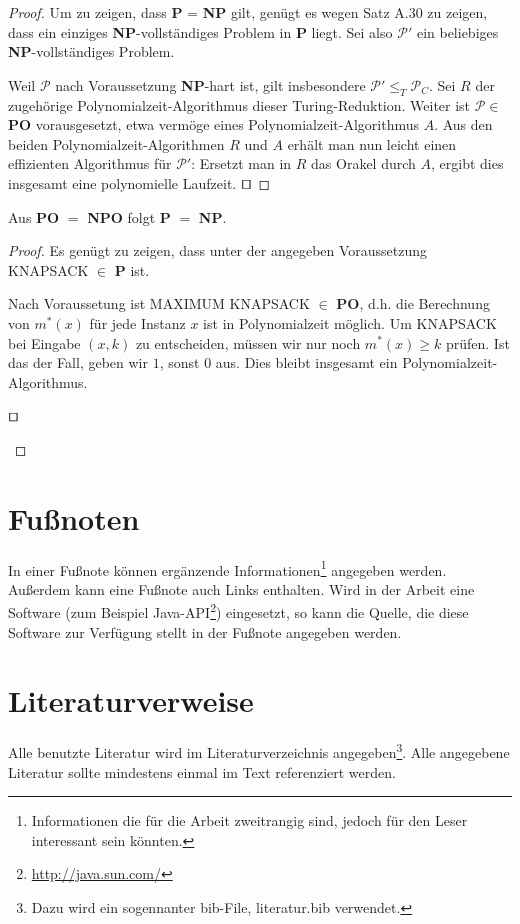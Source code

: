 \begin{proof} Um zu zeigen, dass \textbf{P} = \textbf{NP} gilt, genügt es
wegen Satz A.30 zu zeigen, dass ein einziges \textbf{NP}-vollständiges
Problem in \textbf{P} liegt. Sei also $\mathcal{P}'$ ein beliebiges \textbf{NP}-vollständiges Problem.

Weil $\mathcal{P}$ nach Voraussetzung \textbf{NP}-hart ist, gilt insbesondere
$\mathcal{P}' \leq_T \mathcal{P}_C$. Sei $R$ der zugehörige
Polynomialzeit-Algorithmus dieser Turing-Reduktion.
Weiter ist $\mathcal{P} \in$ \textbf{PO} vorausgesetzt, etwa vermöge eines
Polynomialzeit-Algorithmus $A$. Aus den beiden
Polynomialzeit-Algorithmen $R$ und $A$ erhält man nun
leicht einen effizienten Algorithmus für $\mathcal{P}'$: Ersetzt man
in $R$ das Orakel durch $A$, ergibt dies insgesamt eine polynomielle
Laufzeit. 
$\qed$
\end{proof}

\begin{lemma} Aus \textbf{PO} $=$ \textbf{NPO} folgt \textbf{P} $=$ \textbf{NP}.
\end{lemma}

\begin{proof} Es genügt zu zeigen, dass unter der angegeben
Voraussetzung KNAPSACK $\in$ \textbf{P} ist.

Nach Voraussetung ist MAXIMUM KNAPSACK $\in$ \textbf{PO},
d.h. die Berechnung von $m^*(x)$ für jede Instanz $x$ ist
in Polynomialzeit möglich. Um KNAPSACK bei Eingabe
$(x,k)$ zu entscheiden, müssen wir nur noch $m^*(x) \geq k$
prüfen. Ist das der Fall, geben wir $1$, sonst $0$ aus. Dies
bleibt insgesamt ein Polynomialzeit-Algorithmus. 
\begin{flushright}
$\qed$
\end{flushright}
\end{proof}

\section{Fußnoten}

In einer Fußnote können ergänzende Informationen\footnote{Informationen die für die Arbeit zweitrangig sind, jedoch für den Leser interessant sein könnten.} angegeben werden. Außerdem kann eine Fußnote auch Links enthalten. Wird in der Arbeit eine Software (zum Beispiel Java-API\footnote{\url{http://java.sun.com/}}) eingesetzt, so kann die Quelle, die diese Software zur Verfügung stellt in der Fußnote angegeben werden.

\section{Literaturverweise}
Alle benutzte Literatur wird im Literaturverzeichnis angegeben\footnote{Dazu wird ein sogennanter bib-File, literatur.bib verwendet.}. Alle angegebene Literatur sollte mindestens einmal im Text referenziert werden.